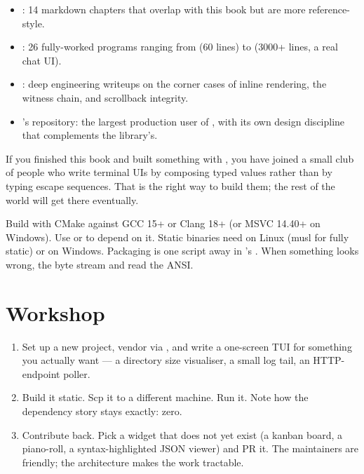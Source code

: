 \begin{itemize}[leftmargin=*]
  \item {}: 14 markdown chapters that overlap with
    this book but are more reference-style.
  \item {}: 26 fully-worked programs ranging
    from  (60 lines) to 
    (3000+ lines, a real chat UI).
  \item {}: deep engineering writeups on
    the corner cases of inline rendering, the witness chain, and
    scrollback integrity.
  \item \agentty{}'s repository: the largest production user of
    \maya{}, with its own design discipline that complements the
    library's.
\end{itemize}

If you finished this book and built something with \maya{}, you have
joined a small club of people who write terminal UIs by composing
typed values rather than by typing escape sequences. That is the
right way to build them; the rest of the world will get there
eventually.

\begin{recap}
Build \maya{} with CMake against GCC 15+ or Clang 18+ (or MSVC
14.40+ on Windows). Use  or
 to depend on it. Static binaries need
 on Linux (musl for fully
static) or  on Windows. Packaging is one script away in
\agentty{}'s . When something looks wrong,
 the byte stream and read the ANSI.
\end{recap}

\section*{Workshop}

\begin{enumerate}[leftmargin=*]
  \item Set up a new project, vendor \maya{} via
    , and write a one-screen TUI for something
    you actually want --- a directory size visualiser, a small
    log tail, an HTTP-endpoint poller.
  \item Build it static. Scp it to a different machine. Run it.
    Note how the dependency story stays exactly: zero.
  \item Contribute back. Pick a widget that does not yet exist
    (a kanban board, a piano-roll, a syntax-highlighted JSON
    viewer) and PR it. The maintainers are friendly; the
    architecture makes the work tractable.
\end{enumerate}
